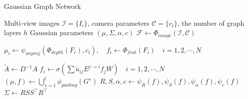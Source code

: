 \begin{algorithm}[t]
\caption{Gaussian Graph Network}\label{algorithm}
\renewcommand{\algorithmicrequire}{\textbf{Input:}}
\renewcommand{\algorithmicensure}{\textbf{Output:}}
\begin{algorithmic}
\Require Multi-view images $\mathcal{I}=\{I_{i}\}$, camera parameters $\mathcal{C}=\{c_{i}\}$, the number of graph layers $h$
\Ensure Gaussian parameters $(\mu, \Sigma, \alpha, c)$
\State $\mathcal{F}\leftarrow\Phi_{image}(\mathcal{I}, \mathcal{C})$

\State $\mu_{i}\leftarrow\psi_{unproj}\left(\Phi_{depth}(F_{i}), c_{i}\right), \quad
    f_{i}\leftarrow\Phi_{feat}(F_{i})\quad i=1,2,\cdots,N$

\State $\tilde{A}\leftarrow D^{-1}A$
    \State $f_{i}\leftarrow\sigma\left(\sum\tilde{a}_{ij}E^{j\rightarrow i}f_{j}W\right)\quad i=1,2,\cdots,N$
\EndFor
\State $(\mu, f)\leftarrow\bigcup_{s=1}^{l}\phi_{pooling}(G^{s})$
\State $R, S, \alpha, c\leftarrow\psi_R(f),\psi_S(f),\psi_{\alpha}(f),\psi_{c}(f)$
\State $\Sigma\leftarrow RSS^{\top}R^{\top}$
\end{algorithmic}
\end{algorithm}

